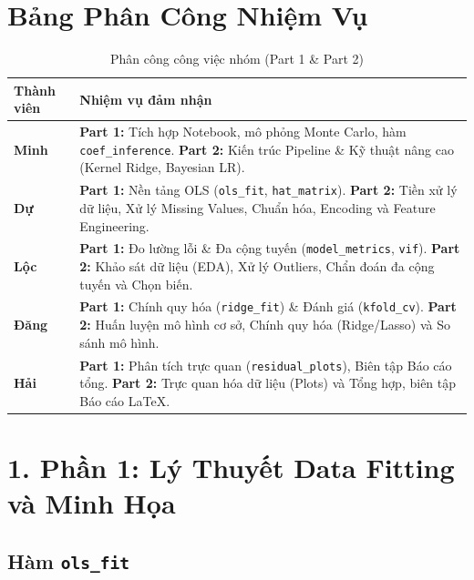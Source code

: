 \section*{Bảng Phân Công Nhiệm Vụ}

\begin{table}[h]
    \centering
    \begin{tabular}{|l|p{10cm}|}
        \hline
        \textbf{Thành viên} & \textbf{Nhiệm vụ đảm nhận} \\
        \hline
        \textbf{Minh} & \textbf{Part 1:} Tích hợp Notebook, mô phỏng Monte Carlo, hàm \texttt{coef\_inference}. \newline \textbf{Part 2:} Kiến trúc Pipeline \& Kỹ thuật nâng cao (Kernel Ridge, Bayesian LR). \\
        \hline
        \textbf{Dự} & \textbf{Part 1:} Nền tảng OLS (\texttt{ols\_fit}, \texttt{hat\_matrix}). \newline \textbf{Part 2:} Tiền xử lý dữ liệu, Xử lý Missing Values, Chuẩn hóa, Encoding và Feature Engineering. \\
        \hline
        \textbf{Lộc} & \textbf{Part 1:} Đo lường lỗi \& Đa cộng tuyến (\texttt{model\_metrics}, \texttt{vif}). \newline \textbf{Part 2:} Khảo sát dữ liệu (EDA), Xử lý Outliers, Chẩn đoán đa cộng tuyến và Chọn biến. \\
        \hline
        \textbf{Đăng} & \textbf{Part 1:} Chính quy hóa (\texttt{ridge\_fit}) \& Đánh giá (\texttt{kfold\_cv}). \newline \textbf{Part 2:} Huấn luyện mô hình cơ sở, Chính quy hóa (Ridge/Lasso) và So sánh mô hình. \\
        \hline
        \textbf{Hải} & \textbf{Part 1:} Phân tích trực quan (\texttt{residual\_plots}), Biên tập Báo cáo tổng. \newline \textbf{Part 2:} Trực quan hóa dữ liệu (Plots) và Tổng hợp, biên tập Báo cáo LaTeX. \\
        \hline
    \end{tabular}
    \caption{Phân công công việc nhóm (Part 1 \& Part 2)}
\end{table}
\newpage
\section{1. Phần 1: Lý Thuyết Data Fitting và Minh Họa}
\subsection{Hàm \texttt{ols\_fit}}

